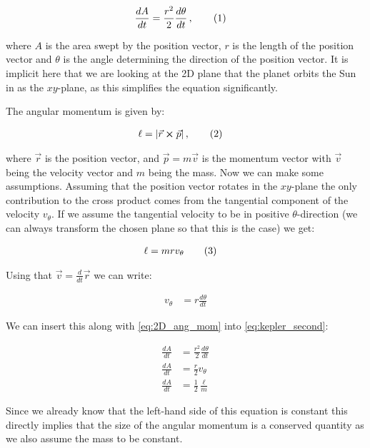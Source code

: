 \documentclass[reprint,english,notitlepage]{revtex4-1}  %
\newcommand\numberthis{\addtocounter{equation}{1}\tag{\theequation}}
\begin{document}
\begin{align*}
\frac{dA}{dt} &= \frac{r^2}{2} \frac{d\theta}{dt} \, , \numberthis \label{eq:kepler_second}
\end{align*}   

where $A$ is the area swept by the position vector, $r$ is the length of the position vector and $\theta$ is the angle determining the direction of the position vector. It is implicit here that we are looking at the 2D plane that the planet orbits the Sun in as the $xy$-plane, as this simplifies the equation significantly. 

The angular momentum is given by:

\begin{align*}
\ell &= |\vec{r} \cross \vec{p}| \, ,\numberthis \label{eq:ang_mom}
\end{align*}

where $\vec{r}$ is the position vector, and $\vec{p} = m \vec{v}$ is the momentum vector with $\vec{v}$ being the velocity vector and $m$ being the mass. Now we can make some assumptions. Assuming that the position vector rotates in the $xy$-plane the only contribution to the cross product comes from the tangential component of the velocity $v_\theta$. If we assume the tangential velocity to be in positive $\theta$-direction (we can always transform the chosen plane so that this is the case) we get:

\begin{align*}
\ell &= mrv_\theta \numberthis \label{eq:2D_ang_mom}
\end{align*}

Using that $\vec{v} = \frac{d}{dt} \vec{r}$ we can write:

\begin{align*}
v_\theta &= r \frac{d\theta}{dt}
\end{align*}

We can insert this along with \eqref{eq:2D_ang_mom} into \eqref{eq:kepler_second}:

\begin{align*}
\frac{dA}{dt} &= \frac{r^2}{2} \frac{d\theta}{dt} \\
\frac{dA}{dt} &= \frac{r}{2} v_\theta \\
\frac{dA}{dt} &= \frac{1}{2} \frac{\ell}{m} 
\end{align*}

Since we already know that the left-hand side of this equation is constant this directly implies that the size of the angular momentum is a conserved quantity as we also assume the mass to be constant. 
\end{document}
